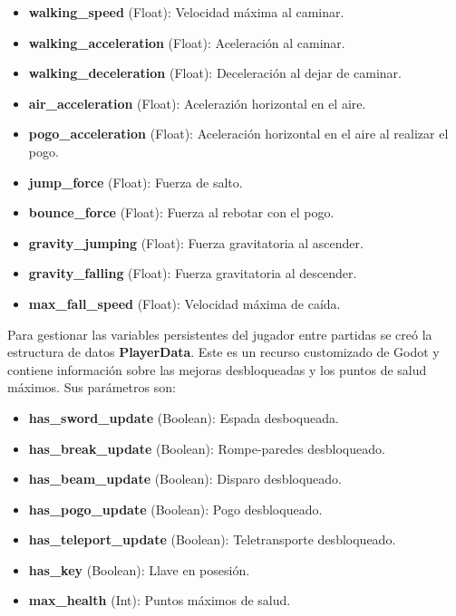 \begin{itemize}
    \item \textbf{walking\_speed} (Float): Velocidad máxima al caminar.
    \item \textbf{walking\_acceleration} (Float): Aceleración al caminar.
    \item \textbf{walking\_deceleration} (Float): Deceleración al dejar de caminar.
    \item \textbf{air\_acceleration} (Float): Acelerazión horizontal en el aire.
    \item \textbf{pogo\_acceleration} (Float): Aceleración horizontal en el aire al realizar el pogo.
    \item \textbf{jump\_force} (Float): Fuerza de salto.
    \item \textbf{bounce\_force} (Float): Fuerza al rebotar con el pogo.
    \item \textbf{gravity\_jumping} (Float): Fuerza gravitatoria al ascender.
    \item \textbf{gravity\_falling} (Float): Fuerza gravitatoria al descender.
    \item \textbf{max\_fall\_speed} (Float): Velocidad máxima de caída.
\end{itemize}

Para gestionar las variables persistentes del jugador entre partidas se creó la estructura de datos \textbf{PlayerData}. Este es un recurso customizado de Godot y contiene información sobre las mejoras desbloqueadas y los puntos de salud máximos. Sus parámetros son:

\begin{itemize}
    \item \textbf{has\_sword\_update} (Boolean): Espada desboqueada.
    \item \textbf{has\_break\_update} (Boolean): Rompe-paredes desbloqueado.
    \item \textbf{has\_beam\_update} (Boolean): Disparo desbloqueado.
    \item \textbf{has\_pogo\_update} (Boolean): Pogo desbloqueado.
    \item \textbf{has\_teleport\_update} (Boolean): Teletransporte desbloqueado.
    \item \textbf{has\_key} (Boolean): Llave en posesión.
    \item \textbf{max\_health} (Int): Puntos máximos de salud.
\end{itemize}

